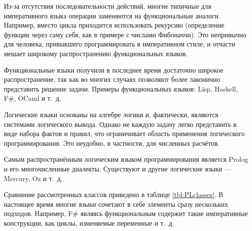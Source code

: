 Из-за отсутствия последовательности действий, многие типичные для
императивного языка операции заменяются на функциональные аналоги.
Например, вместо цикла приходится использовать рекурсию (определение
функции через саму себя, как в примере с числами Фибоначчи). Это
непривычно для человека, привыкшего программировать в императивном
стиле, и отчасти мешает широкому распространению функциональных
языков.

Функциональные языки получили в последнее время достаточно широкое
распространение, так как во многих случаях позволяют более лаконично
представить решение задачи. Примеры функциональных языков: Lisp,
Haskell, F\#, OCaml и т.~д.

Логические языки основаны на алгебре логики и, фактически, являются
системами логического вывода. Однако не каждую задачу легко
представить в виде набора фактов и правил, что ограничивает область
применения логического программирования. Это неудобно, в частности,
для численных расчётов.

Самым распространённым логическим языком программирования является
Prolog и его многочисленные диалекты. Существуют и другие логические
языки — Mercury, Oz и т.~д.

Сравнение рассмотренных классов приведено в таблице
\ref{tbl:PLclasses}.  В настоящее время многие языки сочетают в себе
элементы сразу нескольких подходов. Например, F\# являясь
функциональным содержит такие императивные конструкции, как циклы,
изменяемые переменные и т.~д.


